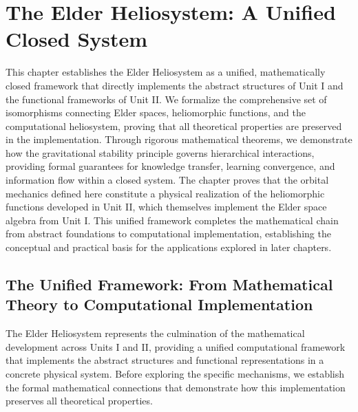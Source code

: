 \chapter{The Elder Heliosystem: A Unified Closed System}

\begin{tcolorbox}[colback=PureBlue!5!white,colframe=PureBlue!75!black,title=Chapter Summary]
This chapter establishes the Elder Heliosystem as a unified, mathematically closed framework that directly implements the abstract structures of Unit I and the functional frameworks of Unit II. We formalize the comprehensive set of isomorphisms connecting Elder spaces, heliomorphic functions, and the computational heliosystem, proving that all theoretical properties are preserved in the implementation. Through rigorous mathematical theorems, we demonstrate how the gravitational stability principle governs hierarchical interactions, providing formal guarantees for knowledge transfer, learning convergence, and information flow within a closed system. The chapter proves that the orbital mechanics defined here constitute a physical realization of the heliomorphic functions developed in Unit II, which themselves implement the Elder space algebra from Unit I. This unified framework completes the mathematical chain from abstract foundations to computational implementation, establishing the conceptual and practical basis for the applications explored in later chapters.
\end{tcolorbox}

\section{The Unified Framework: From Mathematical Theory to Computational Implementation}

The Elder Heliosystem represents the culmination of the mathematical development across Units I and II, providing a unified computational framework that implements the abstract structures and functional representations in a concrete physical system. Before exploring the specific mechanisms, we establish the formal mathematical connections that demonstrate how this implementation preserves all theoretical properties.

